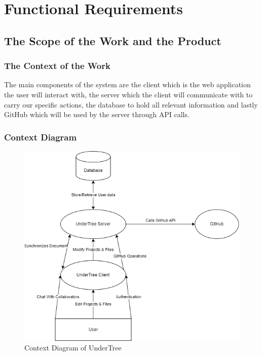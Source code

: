 \documentclass[12pt, titlepage]{article}
\begin{document}
	\section{Functional Requirements}
	
	\subsection{The Scope of the Work and the Product}
	
	\subsubsection{The Context of the Work}
	
	The main components of the system are the client which is the web application the user will interact with, the server which the client will communicate with to carry our specific actions, the database to hold all relevant information and lastly GitHub which will be used by the server through API calls.
	
	\subsubsection{Context Diagram}
	
	\begin{figure}[H]
		\centering
		\includegraphics[scale=0.7]{system_context.png}
		\caption{Context Diagram of UnderTree}
	\end{figure}
	\newpage
\end{document}
